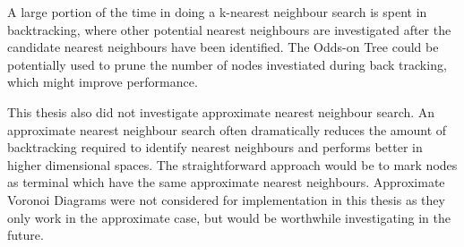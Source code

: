 \documentclass[mcs]{scsthesis}
\begin{document}
A large portion of the time in doing a k-nearest neighbour search is spent in
backtracking, where other potential nearest neighbours are investigated after
the candidate nearest neighbours have been identified. The Odds-on Tree could
be potentially used to prune the number of nodes investiated during back
tracking, which might improve performance.

This thesis also did not investigate approximate nearest neighbour search. An
approximate nearest neighbour search often dramatically reduces the amount of
backtracking required to identify nearest neighbours and performs better in
higher dimensional spaces. The straightforward approach would be to mark nodes
as terminal which have the same approximate nearest neighbours. Approximate
Voronoi Diagrams \cite{avd} were not considered for implementation in this
thesis as they only work in the approximate case, but would be worthwhile
investigating in the future.
\end{document}
